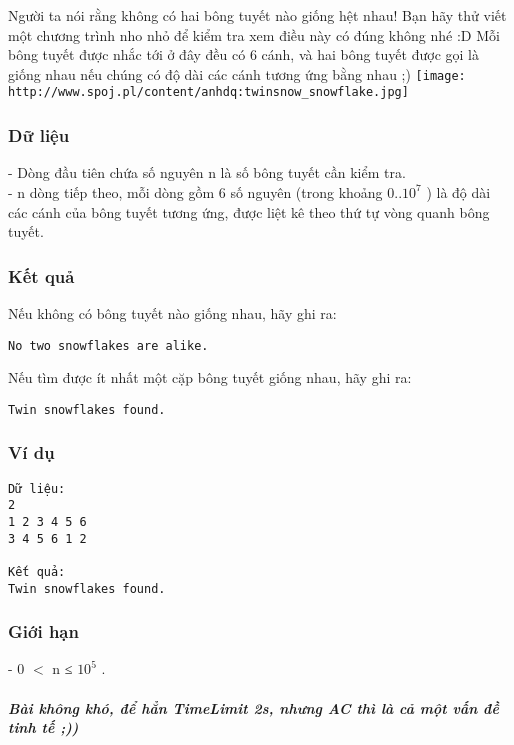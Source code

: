 



   Người ta nói rằng không có hai bông tuyết nào giống hệt nhau! Bạn hãy thử viết một chương trình nho nhỏ để kiểm tra xem điều này có đúng không nhé :D Mỗi bông tuyết được nhắc tới ở đây đều có 6 cánh, và hai bông tuyết được gọi là giống nhau nếu chúng có độ dài các cánh tương ứng bằng nhau ;)  
\texttt{[image: http://www.spoj.pl/content/anhdq:twinsnow\_snowflake.jpg]}

\subsubsection{   Dữ liệu  }

   - Dòng đầu tiên chứa số nguyên n là số bông tuyết cần kiểm tra.   
\\   - n dòng tiếp theo, mỗi dòng gồm 6 số nguyên (trong khoảng 0..$10^{7}$   ) là độ dài các cánh của bông tuyết tương ứng, được liệt kê theo thứ tự vòng quanh bông tuyết.  

\subsubsection{   Kết quả  }

   Nếu không có bông tuyết nào giống nhau, hãy ghi ra:  
\begin{verbatim}
No two snowflakes are alike.\end{verbatim}

   Nếu tìm được ít nhất một cặp bông tuyết giống nhau, hãy ghi ra:  
\begin{verbatim}
Twin snowflakes found.\end{verbatim}

\subsubsection{   Ví dụ  }
\begin{verbatim}
Dữ liệu:
2
1 2 3 4 5 6
3 4 5 6 1 2

Kết quả:
Twin snowflakes found.
\end{verbatim}

\subsubsection{   Giới hạn  }

   - 0 $<$ n ≤ $10^{5}$   .  

\paragraph{\textit{    Bài không khó, để hẳn TimeLimit 2s, nhưng AC thì là cả một vấn đề tinh tế ;))   }}
